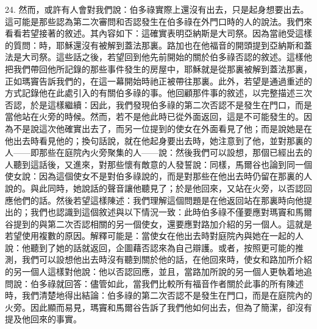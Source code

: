24. 然而，或許有人會對我們說：伯多祿實際上還沒有出去，只是起身想要出去。這可能是那些認為第二次審問和否認發生在伯多祿在外門口時的人的說法。我們來看看若望接著的敘述。其內容如下：這確實表明亞納斯是大司祭。因為當祂受這樣的質問：時，耶穌還沒有被解到蓋法那裏。路加也在他福音的開頭提到亞納斯和蓋法是大司祭。這些話之後，若望回到他先前開始的關於伯多祿否認的敘述。這樣他把我們帶回他所記錄的那些事件發生的房屋中，耶穌就是從那裏被解到蓋法那裏，正如瑪竇告訴我們的，在這一幕開始時祂正被帶往那裏。此外，若望是通過重述的方式記錄他在此處引入的有關伯多祿的事。他回顧那件事的敘述，以完整描述三次否認，於是這樣繼續：因此，我們發現伯多祿的第二次否認不是發生在門口，而是當他站在火旁的時候。然而，若不是他此時已從外面返回，這是不可能發生的。因為不是說這次他確實出去了，而另一位提到的使女在外面看見了他；而是說她是在他出去時看見他的；換句話說，就在他起身要出去時，她注意到了他，並對那裏的人——即那些在庭院內火旁聚集的人——說：然後我們可以設想，那個已經出去的人聽到這話後，又進來，對那些懷有敵意的人發誓說：同樣，馬爾谷也論到同一個使女說：因為這個使女不是對伯多祿說的，而是對那些在他出去時仍留在那裏的人說的。與此同時，她說話的聲音讓他聽見了；於是他回來，又站在火旁，以否認回應他們的話。然後若望這樣陳述：我們理解這個問題是在他返回站在那裏時向他提出的；我們也認識到這個敘述與以下情況一致：此時伯多祿不僅要應對瑪竇和馬爾谷提到的與第二次否認相關的另一個使女，還要應對路加介紹的另一個人。這就是若望使用複數的原因。解釋可能是：當使女在他出去時對庭院內與她在一起的人說：他聽到了她的話就返回，企圖藉否認來為自己辯護。或者，按照更可能的推測，我們可以設想他出去時沒有聽到關於他的話，在他回來時，使女和路加所介紹的另一個人這樣對他說：他以否認回應，並且，當路加所說的另一個人更執着地追問說：伯多祿就回答：儘管如此，當我們比較所有福音作者關於此事的所有陳述時，我們清楚地得出結論：伯多祿的第二次否認不是發生在門口，而是在庭院內的火旁。因此顯而易見，瑪竇和馬爾谷告訴了我們他如何出去，但為了簡潔，卻沒有提及他回來的事實。\par

